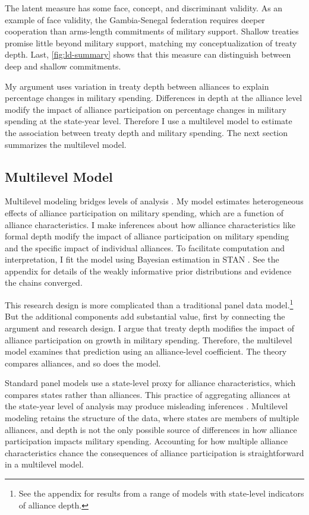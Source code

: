 \documentclass[12pt]{article}
\begin{document}
The latent measure has some face, concept, and discriminant validity. 
As an example of face validity, the Gambia-Senegal federation requires deeper cooperation than arms-length commitments of military support. 
Shallow treaties promise little beyond military support, matching my conceptualization of treaty depth. 
Last, \autoref{fig:ld-summary} shows that this measure can distinguish between deep and shallow commitments. 


My argument uses variation in treaty depth between alliances to explain percentage changes in military spending.
Differences in depth at the alliance level modify the impact of alliance participation on percentage changes in military spending at the state-year level. 
Therefore I use a multilevel model to estimate the association between treaty depth and military spending.  
The next section summarizes the multilevel model. 


\subsection{Multilevel Model} 


Multilevel modeling bridges levels of analysis \citep{SteenbergenJones2002, GelmanHill2007}. 
My model estimates heterogeneous effects of alliance participation on military spending, which are a function of alliance characteristics. 
I make inferences about how alliance characteristics like formal depth modify the impact of alliance participation on military spending and the specific impact of individual alliances. 
To facilitate computation and interpretation, I fit the model using Bayesian estimation in STAN \citep{Carpenteretal2016}. 
See the appendix for details of the weakly informative prior distributions and evidence the chains converged.


This research design is more complicated than a traditional panel data model.\footnote{See the appendix for results from a range of models with state-level indicators of alliance depth.}
But the additional components add substantial value, first by connecting the argument and research design.
I argue that treaty depth modifies the impact of alliance participation on growth in military spending. 
Therefore, the multilevel model examines that prediction using an alliance-level coefficient.
The theory compares alliances, and so does the model. 


Standard panel models use a state-level proxy for alliance characteristics, which compares states rather than alliances.
This practice of aggregating alliances at the state-year level of analysis may produce misleading inferences \citep{McElreath2016}.
Multilevel modeling retains the structure of the data, where states are members of multiple alliances, and depth is not the only possible source of differences in how alliance participation impacts military spending. 
Accounting for how multiple alliance characteristics chance the consequences of alliance participation is straightforward in a multilevel model. 
\end{document}
